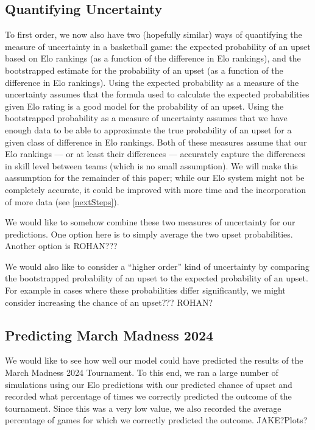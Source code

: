 \documentclass{article}
\begin{document}
\subsection{Quantifying Uncertainty}
To first order, we now also have two (hopefully similar) ways of quantifying the measure of uncertainty in a basketball game: the expected probability of an upset based on Elo rankings (as a function of the difference in Elo rankings), and the bootstrapped estimate for the probability of an upset (as a function of the difference in Elo rankings). Using the expected probability as a measure of the uncertainty assumes that the formula used to calculate the expected probabilities given Elo rating is a good model for the probability of an upset. Using the bootstrapped probability as a measure of uncertainty assumes that we have enough data to be able to approximate the true probability of an upset for a given class of difference in Elo rankings. Both of these measures assume that our Elo rankings --- or at least their differences --- accurately capture the differences in skill level between teams (which is no small assumption). We will make this aassumption for the remainder of this paper; while our Elo system might not be completely accurate, it could be improved with more time and the incorporation of more data (see \autoref{nextSteps}).

We would like to somehow combine these two measures of uncertainty for our predictions. One option here is to simply average the two upset probabilities. Another option is ROHAN???


We would also like to consider a ``higher order'' kind of uncertainty by comparing the bootstrapped probability of an upset to the expected probability of an upset. For example in cases where these probabilities differ significantly, we might consider increasing the chance of an upset??? ROHAN?\@

\subsection{Predicting March Madness 2024}
We would like to see how well our model could have predicted the results of the March Madness 2024 Tournament. To this end, we ran a large number of simulations using our Elo predictions with our predicted chance of upset and recorded what percentage of times we correctly predicted the outcome of the tournament. Since this was a very low value, we also recorded the average percentage of games for which we correctly predicted the outcome. JAKE?\@ Plots?
\end{document}

